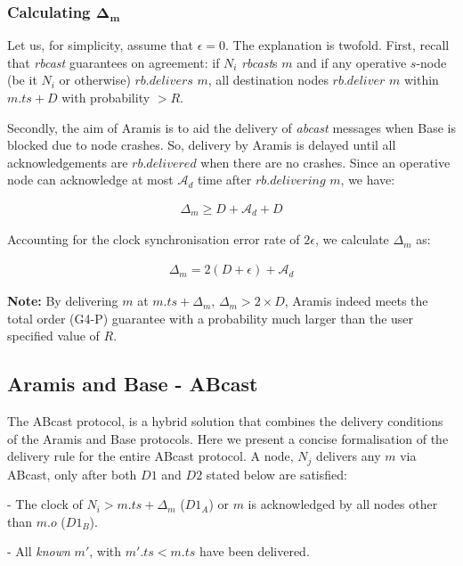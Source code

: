     
        \subsubsection*{Calculating $\boldsymbol{\Delta_m}$}
        Let us, for simplicity, assume that $\epsilon = 0$.  The explanation is twofold.  First, recall that \emph{rbcast} guarantees on agreement: if $N_i$ \emph{rbcast}s $m$ and if any operative $s$-node (be it $N_i$ or otherwise) $rb.delivers$ $m$, all destination nodes $rb.deliver$ $m$ within $m.ts + D$ with probability $> R$.  
        
        Secondly, the aim of \textsf{Aramis} is to aid the delivery of \emph{abcast} messages when \textsf{Base} is blocked due to node crashes.  So, delivery by \textsf{Aramis} is delayed until all acknowledgements are $rb.delivered$ when there are no crashes.  Since an operative node can acknowledge at most $\mathcal{A}_d$ time after $rb.delivering$ $m$, we have:
        
        \begin{equation}
            \begin{aligned}
                \Delta_m \geq D + \mathcal{A}_d + D
            \end{aligned}
        \end{equation}
        
        Accounting for the clock synchronisation error rate of $2\epsilon$, we calculate $\Delta_m$ as:
        
        \begin{equation}
            \begin{aligned}
                \Delta_m = 2(D + \epsilon) +  \mathcal{A}_d
            \end{aligned}
        \end{equation}
        
        \textbf{Note:} By delivering $m$ at $m.ts + \Delta_m$, $\Delta_m > 2 \times D$, \textsf{Aramis} indeed meets the total order (G4-P) guarantee with a probability much larger than the user specified value of $R$. 
                
        \subsection{Aramis and Base - \textsf{ABcast}}
        The \textsf{ABcast} protocol, is a hybrid solution that combines the delivery conditions of the \textsf{Aramis} and \textsf{Base} protocols.  Here we present a concise formalisation of the delivery rule for the entire \textsf{ABcast} protocol.  A node, $N_j$ delivers any $m$ via \textsf{ABcast}, only after both $D1$ and $D2$ stated below are satisfied:
	    \begin{description}[labelindent=1cm]
	        \item[$\boldsymbol{D1}$] - The clock of $N_i > m.ts + \Delta_{m}$ ($D1_A$) or $m$ is acknowledged by all nodes other than $m.o$ ($D1_B$). 
	        
	        \item[$\boldsymbol{D2}$] - All \emph{known} $m'$, with $m'.ts < m.ts$ have been delivered.
	    \end{description}
	    

